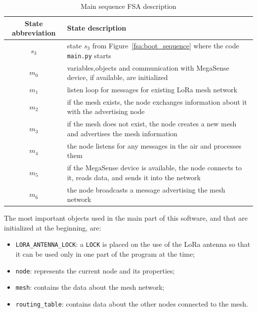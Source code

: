 				\begin{table}[h]
					\begin{center}
						\begin{tabular}{|c|m{10.2cm}|} 
							\hline
							\textbf{State abbreviation} & \textbf{State description} \\\hline
							$s_{3}$ & state $s_{3}$ from Figure~\ref{fsa:boot_sequence} where the code \texttt{main.py} starts\\\hline
							$m_{0}$ & variables,objects and communication with MegaSense device, if available, are initialized\\\hline
							$m_{1}$ & listen loop for messages for existing LoRa mesh network\\\hline
							$m_{2}$ & if the mesh exists, the node exchanges information about it with the advertising node\\\hline
							$m_{3}$ & if the mesh does not exist, the node creates a new mesh and advertises the mesh information\\\hline
							$m_{4}$ & the node listens for any messages in the air and processes them\\\hline
							$m_{5}$ & if the MegaSense device is available, the node connects to it, reads data, and sends it into the network\\\hline
							$m_{6}$ & the node broadcasts a message advertising the mesh network\\\hline
						\end{tabular}
						\caption{Main sequence FSA description}
						\label{table:fsa_main}
					\end{center}
				\end{table}
			
				The most important objects used in the main part of this software, and that are initialized at the beginning, are:
				\begin{itemize}
					\item \texttt{LORA\_ANTENNA\_LOCK}: a \texttt{LOCK} is placed on the use of the LoRa antenna so that it can be used only in one part of the program at the time; 
				    \item \texttt{node}: represents the current node and its properties;
					\item \texttt{mesh}: contains the data about the mesh network;
					\item \texttt{routing\_table}: contains data about the other nodes connected to the mesh.
				\end{itemize}
			
